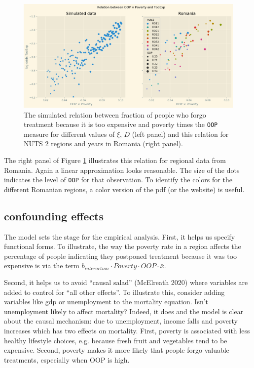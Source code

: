 \documentclass[a4paper,12pt]{article}
\makeatletter
\newcommand{\citeprocitem}[2]{\hyper@linkstart{cite}{citeproc_bib_item_#1}#2\hyper@linkend}
\makeatother
\begin{document}
\begin{figure}[htbp]
\centering
\includegraphics[width=.9\linewidth]{./figures/Parametric3.png}
\caption{\label{fig:Parametric}The simulated relation between fraction of people who forgo treatment because it is too expensive and poverty times the \texttt{OOP} measure for different values of \(\xi\), \(D\) (left panel) and this relation for NUTS 2 regions and years in Romania (right panel).}
\end{figure}

The right panel of Figure \ref{fig:Parametric} illustrates this relation for regional data from Romania. Again a linear approximation looks reasonable. The size of the dots indicates the level of \texttt{OOP} for that observation. To identify the colors for the different Romanian regions, a color version of the pdf (or the website) is useful.

\subsection{confounding effects}
\label{sec:orgaecb06a}
\label{sec:confounding_effects}

The model sets the stage for the empirical analysis. First, it helps us specify functional forms. To illustrate, the way the poverty rate in a region affects the percentage of people indicating they postponed treatment because it was too expensive is via the term \(b_{interaction} \cdot Poverty \cdot OOP \cdot \bar x\).

Second, it helps us to avoid ``causal salad'' (\citeprocitem{17}{McElreath 2020}) where variables are added to control for ``all other effects''. To illustrate this, consider adding variables like gdp or unemployment to the mortality equation. Isn't unemployment likely to affect mortality? Indeed, it does and the model is clear about the causal mechanism: due to unemployment, income falls and poverty increases which has two effects on mortality. First, poverty is associated with less healthy lifestyle choices, e.g. because fresh fruit and vegetables tend to be expensive. Second, poverty makes it more likely that people forgo valuable treatments, especially when OOP is high. 
\end{document}
